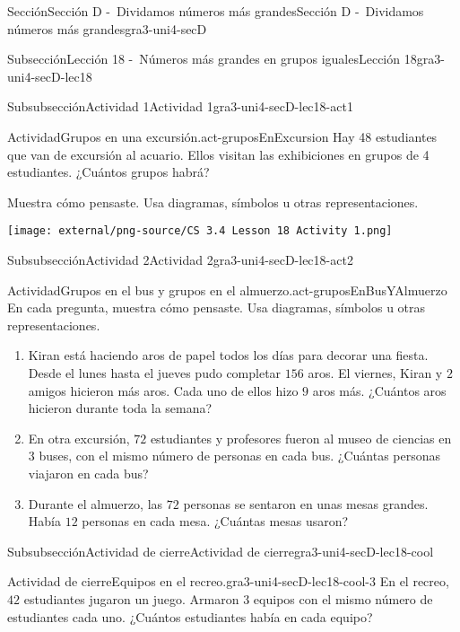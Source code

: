 \documentclass[twoside,10pt,]{article}
\begin{document}
\begin{sectionptx}{Sección}{Sección D -~Dividamos números más grandes}{}{Sección D -~Dividamos números más grandes}{}{}{gra3-uni4-secD}
\begin{subsectionptx}{Subsección}{Lección 18 -~Números más grandes en grupos iguales}{}{Lección 18}{}{}{gra3-uni4-secD-lec18}
\begin{subsubsectionptx}{Subsubsección}{Actividad 1}{}{Actividad 1}{}{}{gra3-uni4-secD-lec18-act1}
\begin{activity}{Actividad}{Grupos en una excursión.}{act-gruposEnExcursion}
Hay 48 estudiantes que van de excursión al acuario. Ellos visitan las exhibiciones en grupos de 4 estudiantes. ¿Cuántos grupos habrá?%
\par
Muestra cómo pensaste. Usa diagramas, símbolos u otras representaciones.%
\begin{image}{0.15}{0.7}{0.15}{}%
\texttt{[image: external/png-source/CS 3.4 Lesson 18 Activity 1.png]}
\end{image}%
\end{activity}%
\end{subsubsectionptx}
%
%
\typeout{************************************************}
\typeout{************************************************}
%
\begin{subsubsectionptx}{Subsubsección}{Actividad 2}{}{Actividad 2}{}{}{gra3-uni4-secD-lec18-act2}
\begin{activity}{Actividad}{Grupos en el bus y grupos en el almuerzo.}{act-gruposEnBusYAlmuerzo}%
En cada pregunta, muestra cómo pensaste. Usa diagramas, símbolos u otras representaciones.%
%
\begin{enumerate}
\item{}Kiran está haciendo aros de papel todos los días para decorar una fiesta. Desde el lunes hasta el jueves pudo completar \(156\) aros. El viernes, Kiran y \(2\) amigos hicieron más aros. Cada uno de ellos hizo \(9\) aros más. ¿Cuántos aros hicieron durante toda la semana?%
\item{}En otra excursión, \(72\) estudiantes y profesores fueron al museo de ciencias en \(3\) buses, con el mismo número de personas en cada bus. ¿Cuántas personas viajaron en cada bus?%
\item{}Durante el almuerzo, las \(72\) personas se sentaron en unas mesas grandes. Había \(12\) personas en cada mesa. ¿Cuántas mesas usaron?%
\end{enumerate}
\end{activity}%
\end{subsubsectionptx}
%
%
\typeout{************************************************}
\typeout{************************************************}
%
\begin{subsubsectionptx}{Subsubsección}{Actividad de cierre}{}{Actividad de cierre}{}{}{gra3-uni4-secD-lec18-cool}
\begin{project}{Actividad de cierre}{Equipos en el recreo.}{gra3-uni4-secD-lec18-cool-3}%
En el recreo, \(42\) estudiantes jugaron un juego. Armaron \(3\) equipos con el mismo número de estudiantes cada uno. ¿Cuántos estudiantes había en cada equipo?%

\end{project}
\end{subsubsectionptx}
\end{subsectionptx}
\end{sectionptx}
\end{document}
